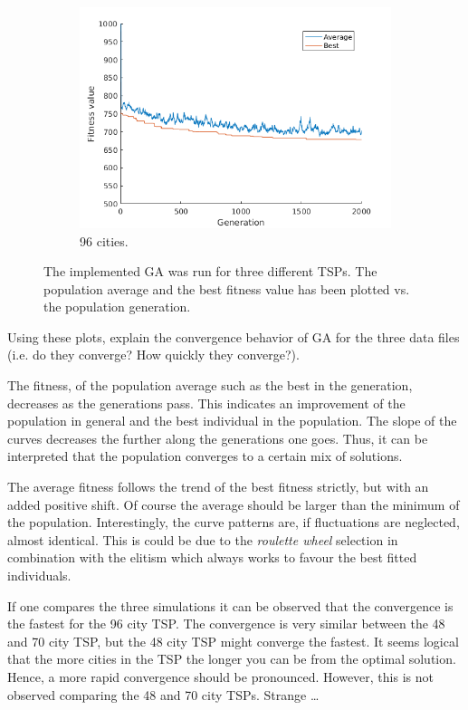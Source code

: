 \documentclass[]{article}
\begin{document}
\begin{figure}[H]
  \begin{subfigure}{\textwidth}
     \centering
     \includegraphics[width=0.5\linewidth]{../GA_TSP/t196.png}
     \caption{96 cities.}
     \label{sfig:t196}
  \end{subfigure}%
  \caption{The implemented GA was run for three different TSPs. The population average and the best fitness value has been plotted vs. the population generation.}
  \label{fig:task1}
\end{figure}

Using these plots, explain the convergence behavior of GA for the three data files (i.e. do they converge? How quickly they converge?).

The fitness, of the population average such as the best in the generation, decreases as the generations pass.
This indicates an improvement of the population in general and the best individual in the population.
The slope of the curves decreases the further along the generations one goes.
Thus, it can be interpreted that the population converges to a certain mix of solutions.

The average fitness follows the trend of the best fitness strictly, but with an added positive shift.
Of course the average should be larger than the minimum of the population.
Interestingly, the curve patterns are, if fluctuations are neglected, almost identical.
This is could be due to the {\it roulette wheel} selection in combination with the elitism which always works to favour the best fitted individuals.

If one compares the three simulations it can be observed that the convergence is the fastest for the 96 city TSP.
The convergence is very similar between the 48 and 70 city TSP, but the 48 city TSP might converge the fastest.
It seems logical that the more cities in the TSP the longer you can be from the optimal solution.
Hence, a more rapid convergence should be pronounced.
However, this is not observed comparing the 48 and 70 city TSPs.
Strange \dots
\end{document}
